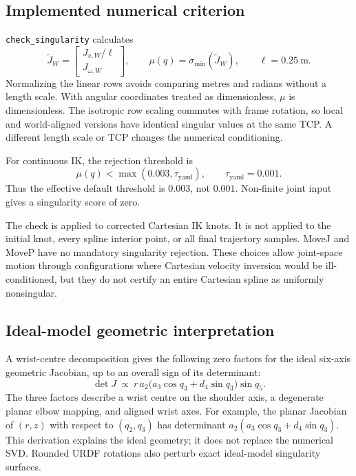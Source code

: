 \documentclass[11pt,a4paper]{report}
\newcommand{\file}[1]{\nolinkurl{#1}}
\begin{document}
\subsection{Implemented numerical criterion}
\file{check_singularity} calculates
\begin{equation}
 \widetilde J_W=\begin{bmatrix}J_{v,W}/\ell\\J_{\omega,W}\end{bmatrix},\qquad
 \mu(q)=\sigma_{\min}(\widetilde J_W),\qquad \ell=0.25\ \mathrm{m}.
\end{equation}
Normalizing the linear rows avoids comparing metres and radians without a
length scale. With angular coordinates treated as dimensionless, $\mu$ is
dimensionless. The isotropic row scaling commutes with frame rotation, so
local and world-aligned versions have identical singular values at the same
TCP. A different length scale or TCP changes the numerical conditioning.

For continuous IK, the rejection threshold is
\begin{equation}
 \mu(q)<\max(0.003,\tau_{\mathrm{yaml}}),\qquad
 \tau_{\mathrm{yaml}}=0.001.
\end{equation}
Thus the effective default threshold is $0.003$, not $0.001$. Non-finite
joint input gives a singularity score of zero.

The check is applied to corrected Cartesian IK knots. It is not applied to
the initial knot, every spline interior point, or all final trajectory
samples. MoveJ and MoveP have no mandatory singularity rejection. These
choices allow joint-space motion through configurations where Cartesian
velocity inversion would be ill-conditioned, but they do not certify an
entire Cartesian spline as uniformly nonsingular.

\subsection{Ideal-model geometric interpretation}
A wrist-centre decomposition gives the following zero factors for the ideal
six-axis geometric Jacobian, up to an overall sign of its determinant:
\begin{equation}
 \det J\ \propto\
 r\,a_2\bigl(a_3\cos q_3+d_4\sin q_3\bigr)\sin q_5.
 \label{eq:det}
\end{equation}
The three factors describe a wrist centre on the shoulder axis, a degenerate
planar elbow mapping, and aligned wrist axes. For example, the planar
Jacobian of $(r,z)$ with respect to $(q_2,q_3)$ has determinant
$a_2(a_3\cos q_3+d_4\sin q_3)$.
This derivation explains the ideal geometry; it does not replace the
numerical SVD. Rounded URDF rotations also perturb exact ideal-model singularity surfaces.
\end{document}
